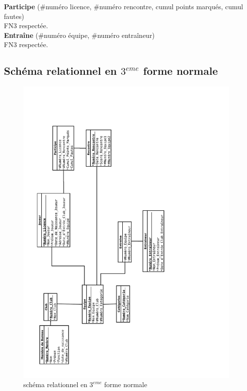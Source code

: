 \documentclass{article}
\begin{document}
\textbf{Participe} (\#numéro licence, \#numéro rencontre, cumul points marqués, cumul fautes) \\
FN3 respectée. \\


\textbf{Entraîne} (\#numéro équipe, \#numéro entraîneur) \\
FN3 respectée.

\newpage
\subsection{Schéma relationnel en $3^{eme}$ forme normale}

\begin{figure}[h!]
\centering
\includegraphics[scale = 0.35, angle = -90]{BasketBall_Relationnel.pdf}
\caption{schéma relationnel en $3^{eme}$ forme normale}
\end{figure}
\end{document}
